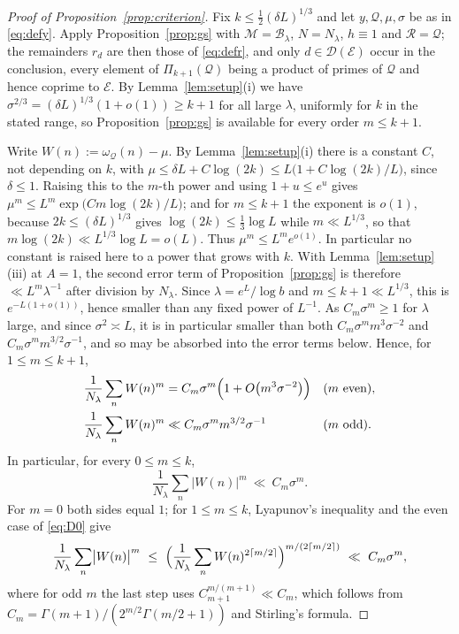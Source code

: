 \documentclass[11pt,a4paper]{article}
\theoremstyle{plain}
\theoremstyle{definition}
\numberwithin{equation}{section}
\begin{document}
\begin{proof}[Proof of Proposition~\ref{prop:criterion}]
Fix $k\le\frac12(\delta L)^{1/3}$ and let $y,\mathcal Q,\mu,\sigma$ be as in \eqref{eq:defy}. Apply
Proposition~\ref{prop:gs} with $\mathcal M=\mathcal B_\lambda$, $N=N_\lambda$, $h\equiv1$ and
$\mathcal R=\mathcal Q$; the remainders $r_d$ are then those of \eqref{eq:defr}, and only
$d\in\mathcal D(\mathcal E)$ occur in the conclusion, every element of $\Pi_{k+1}(\mathcal Q)$ being a
product of primes of $\mathcal Q$ and hence coprime to $\mathcal E$. By Lemma~\ref{lem:setup}(i) we have
$\sigma^{2/3}=(\delta L)^{1/3}(1+o(1))\ge k+1$ for all large $\lambda$, uniformly for $k$ in the
stated range, so Proposition~\ref{prop:gs} is available for every order $m\le k+1$.

Write $W(n):=\omega_{\mathcal Q}(n)-\mu$. By Lemma~\ref{lem:setup}(i) there is a constant $C$, not
depending on $k$, with $\mu\le\delta L+C\log(2k)\le L\bigl(1+C\log(2k)/L\bigr)$, since $\delta\le1$.
Raising this to the $m$-th power and using $1+u\le e^{u}$ gives
$\mu^{m}\le L^{m}\exp\bigl(Cm\log(2k)/L\bigr)$; and for $m\le k+1$ the exponent is $o(1)$, because
$2k\le(\delta L)^{1/3}$ gives $\log(2k)\le\frac13\log L$ while $m\ll L^{1/3}$, so that
$m\log(2k)\ll L^{1/3}\log L=o(L)$. Thus $\mu^{m}\le L^{m}e^{o(1)}$. In particular no constant is
raised here to a power that grows with $k$. With Lemma~\ref{lem:setup}(iii) at $A=1$,
the second error term of Proposition~\ref{prop:gs}
is therefore $\ll L^{m}\lambda^{-1}$ after division by $N_\lambda$. Since $\lambda=e^{L}/\log b$ and
$m\le k+1\ll L^{1/3}$, this is $e^{-L(1+o(1))}$, hence smaller than any fixed power of
$L^{-1}$. As $C_m\sigma^{m}\ge1$ for $\lambda$ large, and since $\sigma^{2}\asymp L$, it is in
particular smaller than both $C_m\sigma^{m}m^{3}\sigma^{-2}$ and $C_m\sigma^{m}m^{3/2}\sigma^{-1}$, and so
may be absorbed into the error terms below. Hence, for $1\le m\le k+1$,
\begin{equation}\label{eq:D0}
\begin{aligned}
\frac1{N_\lambda}\sum_{n}W(n)^{m}
  &=   C_m\sigma^{m}\Bigl(1+O\bigl(m^{3}\sigma^{-2}\bigr)\Bigr) && (m\ \text{even}),\\
\frac1{N_\lambda}\sum_{n}W(n)^{m}
  &\ll C_m\sigma^{m}m^{3/2}\sigma^{-1}                          && (m\ \text{odd}).
\end{aligned}
\end{equation}
In particular, for every $0\le m\le k$,
\begin{equation}\label{eq:absmom}
\frac1{N_\lambda}\sum_{n}\bigl|W(n)\bigr|^{m}\ \ll\ C_m\sigma^{m}.
\end{equation}
For $m=0$ both sides equal $1$; for $1\le m\le k$, Lyapunov's inequality and the even case of
\eqref{eq:D0} give
\[
\frac1{N_\lambda}\sum_{n}\bigl|W(n)\bigr|^{m}
\ \le\ \Bigl(\frac1{N_\lambda}\sum_{n}W(n)^{2\lceil m/2\rceil}\Bigr)^{m/(2\lceil m/2\rceil)}
\ \ll\ C_m\sigma^{m},
\]
where for odd $m$ the last step uses
$C_{m+1}^{m/(m+1)}\ll C_m$, which follows from $C_m=\Gamma(m+1)/(2^{m/2}\Gamma(m/2+1))$ and Stirling's
formula.


\end{proof}
\end{document}
